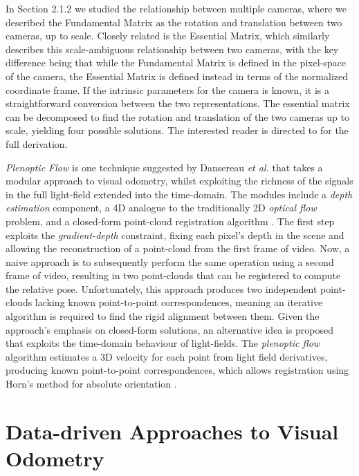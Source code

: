 In Section 2.1.2 we studied the relationship between multiple cameras, where we described the Fundamental Matrix as the rotation and translation between two cameras, up to scale. Closely related is the Essential Matrix, which similarly describes this scale-ambiguous relationship between two cameras, with the key difference being that while the Fundamental Matrix is defined in the pixel-space of the camera, the Essential Matrix is defined instead in terms of the normalized coordinate frame. If the intrinsic parameters for the camera is known, it is a straightforward conversion between the two representations. The essential matrix can be decomposed to find the rotation and translation of the two cameras up to scale, yielding four possible solutions. The interested reader is directed to \cite{zisserman2004multiview} for the full derivation.

\textit{Plenoptic Flow} is one technique suggested by Dansereau \textit{et al.} \cite{dansereau2011plenopticflow} that takes a modular approach to visual odometry, whilst exploiting the richness of the signals in the full light-field extended into the time-domain. The modules include a \textit{depth estimation} component, a 4D analogue to the traditionally 2D \textit{optical flow} problem, and a closed-form point-cloud registration algorithm \cite{horn1987absorientation}. The first step exploits the \textit{gradient-depth} constraint, fixing each pixel's depth in the scene and allowing the reconstruction of a point-cloud from the first frame of video. Now, a naive approach is to subsequently perform the same operation using a second frame of video, resulting in two point-clouds that can be registered to compute the relative pose. Unfortunately, this approach produces two independent point-clouds lacking known point-to-point correspondences, meaning an iterative algorithm is required to find the rigid alignment between them. Given the approach's emphasis on closed-form solutions, an alternative idea is proposed that exploits the time-domain behaviour of light-fields. The \textit{plenoptic flow} algorithm estimates a 3D velocity for each point from light field derivatives, producing known point-to-point correspondences, which allows registration using Horn's method for absolute orientation \cite{horn1987absorientation}.



\section{Data-driven Approaches to Visual Odometry}

